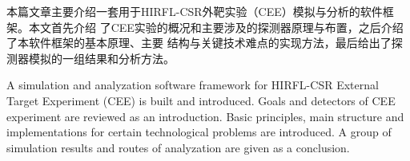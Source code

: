
\begin{cabstract}
本篇文章主要介绍一套用于HIRFL-CSR外靶实验（CEE）模拟与分析的软件框架。本文首先介绍
了CEE实验的概况和主要涉及的探测器原理与布置，之后介绍了本软件框架的基本原理、主要
结构与关键技术难点的实现方法，最后给出了探测器模拟的一组结果和分析方法。
\end{cabstract}

\begin{eabstract}
A simulation and analyzation software framework for HIRFL-CSR External Target
Experiment (CEE) is built and introduced. Goals and detectors of CEE experiment are
reviewed as an introduction. Basic principles, main structure and implementations
for certain technological problems are introduced. A group of simulation results and
routes of analyzation are given as a conclusion.
\end{eabstract}
